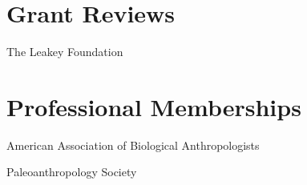 \documentclass{article}
\newenvironment{mylist}
{\begin{description}[style=unboxed,leftmargin=1.3cm]}
{\end{description}}
\begin{document}
\section*{Grant Reviews}
The Leakey Foundation\\

\section*{Professional Memberships}
\begin{mylist}
\item[] American Association of Biological Anthropologists
\item[] Paleoanthropology Society
\end{mylist}
\end{document}

